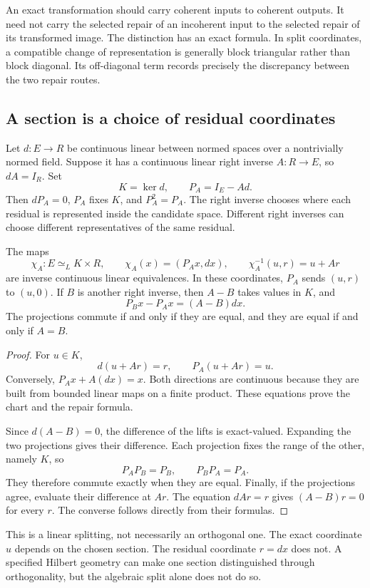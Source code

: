 \label{sec:repair-transport}
An exact transformation should carry coherent inputs to coherent outputs. It need not carry the selected repair of an incoherent input to the selected repair of its transformed image. The distinction has an exact formula. In split coordinates, a compatible change of representation is generally block triangular rather than block diagonal. Its off-diagonal term records precisely the discrepancy between the two repair routes.

\subsection{A section is a choice of residual coordinates}
Let \(d:E\to R\) be continuous linear between normed spaces over a nontrivially normed field. Suppose it has a continuous linear right inverse \(A:R\to E\), so \(dA=I_R\). Set
\[
 K=\ker d,\qquad P_A=I_E-Ad.
\]
Then \(dP_A=0\), \(P_A\) fixes \(K\), and \(P_A^2=P_A\). The right inverse chooses where each residual is represented inside the candidate space. Different right inverses can choose different representatives of the same residual.

\begin{theorem}\label{KS65}
The maps
\[
 \chi_A:E\simeq_L K\times R,\qquad
 \chi_A(x)=(P_Ax,dx),\qquad
 \chi_A^{-1}(u,r)=u+Ar
\]
are inverse continuous linear equivalences. In these coordinates, \(P_A\) sends \((u,r)\) to \((u,0)\). If \(B\) is another right inverse, then \(A-B\) takes values in \(K\), and
\[
 P_Bx-P_Ax=(A-B)dx.
\]
The projections commute if and only if they are equal, and they are equal if and only if \(A=B\).
\end{theorem}
\begin{proof}
For \(u\in K\),
\[
 d(u+Ar)=r,\qquad P_A(u+Ar)=u.
\]
Conversely, \(P_Ax+A(dx)=x\). Both directions are continuous because they are built from bounded linear maps on a finite product. These equations prove the chart and the repair formula.

Since \(d(A-B)=0\), the difference of the lifts is exact-valued. Expanding the two projections gives their difference. Each projection fixes the range of the other, namely \(K\), so
\[
 P_AP_B=P_B,\qquad P_BP_A=P_A.
\]
They therefore commute exactly when they are equal. Finally, if the projections agree, evaluate their difference at \(Ar\). The equation \(dAr=r\) gives \((A-B)r=0\) for every \(r\). The converse follows directly from their formulas.
\end{proof}
This is a linear splitting, not necessarily an orthogonal one. The exact coordinate \(u\) depends on the chosen section. The residual coordinate \(r=dx\) does not. A specified Hilbert geometry can make one section distinguished through orthogonality, but the algebraic split alone does not do so.

